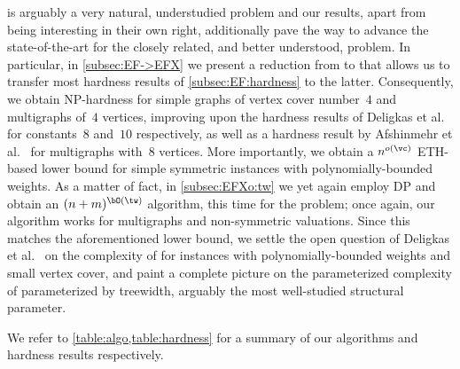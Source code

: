\documentclass[11pt,letterpaper]{article}
\begin{document}
{\EFo} is arguably a very natural, understudied problem and our results, apart from being interesting in their own right,
additionally pave the way to advance the state-of-the-art for the closely related, and better understood, {\EFXo} problem.
In particular, in \cref{subsec:EF->EFX} we present a reduction from {\EFo} to {\EFXo} that allows us to transfer most hardness results of \cref{subsec:EF:hardness}
to the latter. Consequently, we obtain NP-hardness for simple graphs
of vertex cover number~$4$ and multigraphs of~$4$ vertices, improving upon the hardness results of Deligkas et al.~\cite{ijcai/DeligkasEGK25} for constants~$8$ and~$10$ respectively, as well as a hardness result by Afshinmehr et al.~\cite{AfshinmehrDKMR25} for multigraphs with~$8$ vertices.
More importantly, we obtain a $n^{o(\vc)}$ ETH-based lower bound for simple symmetric instances with polynomially-bounded weights.
As a matter of fact, in \cref{subsec:EFXo:tw} we yet again employ DP and obtain an $(n+m)^{\bO(\tw)}$ algorithm,
this time for the {\EFXmc} problem; once again, our algorithm works for multigraphs and non-symmetric valuations.
Since this matches the aforementioned lower bound, we settle the open question of Deligkas et al.~\cite{ijcai/DeligkasEGK25} on the complexity of {\EFXo} for instances with
polynomially-bounded weights and small vertex cover, and paint a complete picture
on the parameterized complexity of {\EFXo} parameterized by treewidth, arguably the most well-studied structural parameter.

We refer to \cref{table:algo,table:hardness} for a summary of our algorithms and hardness results respectively.
\end{document}
